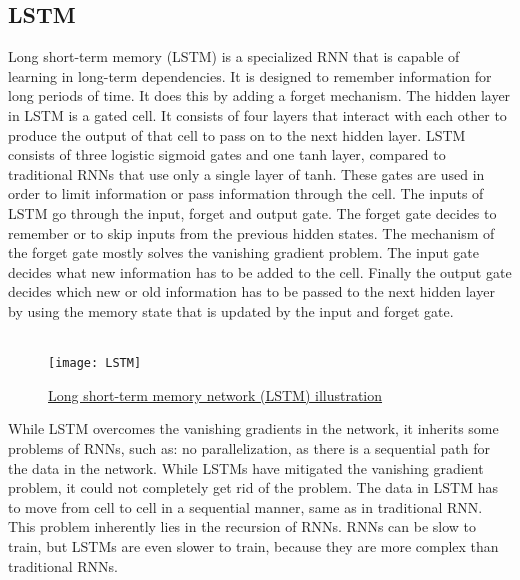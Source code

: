 \subsection{LSTM}
Long short-term memory (LSTM) is a specialized RNN that is capable of learning in long-term dependencies. It is designed to remember information for long periods of time. It does this by adding a forget mechanism. The hidden layer in LSTM is a gated cell. It consists of four layers that interact with each other to produce the output of that cell to pass on to the next hidden layer. LSTM consists of three logistic sigmoid gates and one tanh layer, compared to traditional RNNs that use only a single layer of tanh. These gates are used in order to limit information or pass information through the cell. The inputs of LSTM go through the input, forget and output gate. The forget gate decides to remember or to skip inputs from the previous hidden states. The mechanism of the forget gate mostly solves the vanishing gradient problem. The input gate decides what new information has to be added to the cell. Finally the output gate decides which new or old information has to be passed to the next hidden layer by using the memory state that is updated by the input and forget gate. \\\\

\begin{figure}[!htb]
    \texttt{[image: LSTM]}
    \caption{\href{https://www.researchgate.net/profile/Chinthakunta-Manjunath/publication/347840605/figure/fig1/AS:972281069182976@1608821279006/The-structure-of-the-LSTM-unit.ppm}{Long short-term memory network (LSTM) illustration} }
\end{figure}
While LSTM overcomes the vanishing gradients in the network, it inherits some problems of RNNs, such as: no parallelization, as there is a sequential path for the data in the network. While LSTMs have mitigated the vanishing gradient problem, it could not completely get rid of the problem. The data in LSTM has to move from cell to cell in a sequential manner, same as in traditional RNN. This problem inherently lies in the recursion of RNNs. RNNs can be slow to train, but LSTMs are even slower to train, because they are more complex than traditional RNNs. 

\pagebreak

